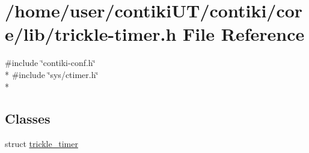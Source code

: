 \hypertarget{trickle-timer_8h}{}\section{/home/user/contiki\+U\+T/contiki/core/lib/trickle-\/timer.h File Reference}
\label{trickle-timer_8h}
{\ttfamily \#include \char`\"{}contiki-\/conf.\+h\char`\"{}}\\*
{\ttfamily \#include \char`\"{}sys/ctimer.\+h\char`\"{}}\\*
\subsection*{Classes}
\begin{DoxyCompactItemize}
\item 
struct \hyperlink{structtrickle__timer}{trickle\+\_\+timer}
\end{DoxyCompactItemize}
